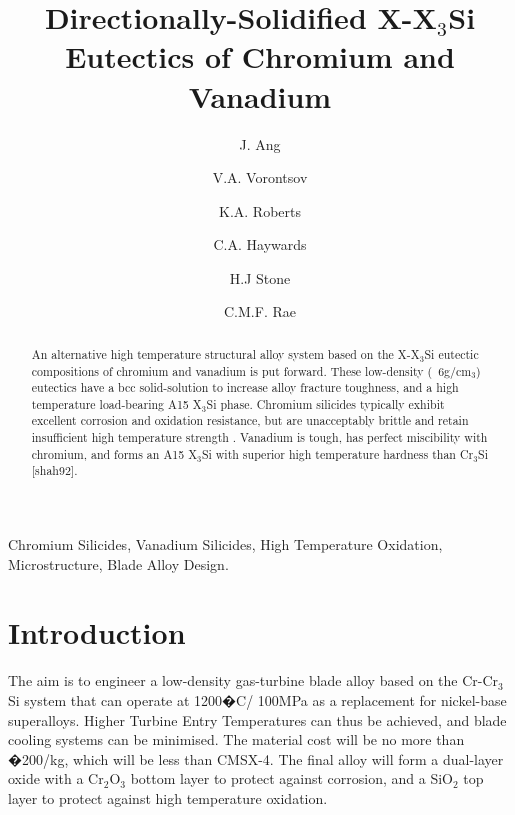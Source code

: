 \documentclass[preprint]{elsarticle}
\begin{document}
\begin{frontmatter}
\title{Directionally-Solidified X-X$_3$Si Eutectics of Chromium and Vanadium}
%
\author[CAM]{J. Ang}
\author[GE]{V.A. Vorontsov}
\author[OSU]{K.A. Roberts}
\author[IMP]{C.A. Haywards}
\author[IMP]{H.J Stone}
\author[CAM]{C.M.F. Rae}


\address[CAM]{Department of Materials Science and Metallurgy, University of Cambridge, Pembroke Street, Cambridge, CB2 3QZ, UK}
\address[GE]{GE Global Research, Niskayuna, NY, 12309, USA}
\address[OSU]{Department of Materials Science and Engineering, The Ohio State University, 2041 College Road, Columbus, OH 43210, USA}
\address[IMP]{Department of Materials, Royal School of Mines, Imperial College, South Kensington, London SW7 2AZ, UK}
%
\begin{abstract}
An alternative high temperature structural alloy system based on the X-X$_3$Si eutectic compositions of chromium and vanadium is put forward. These low-density (~6g/cm$_3$) eutectics have a bcc solid-solution to increase alloy fracture toughness, and a high temperature load-bearing A15 X$_3$Si phase. Chromium silicides typically exhibit excellent corrosion and oxidation resistance, but are unacceptably brittle and retain insufficient high temperature strength \cite{jackson96, fleischer89, sadananda99}. Vanadium is tough, has perfect miscibility with chromium, and forms an A15 X$_3$Si with superior high temperature hardness than Cr$_3$Si [shah92]. 


\end{abstract}

\begin{keyword}
Chromium Silicides, Vanadium Silicides, High Temperature Oxidation, Microstructure, Blade Alloy Design.
\end{keyword}
\end{frontmatter}
%
\section{Introduction}

The aim is to engineer a low-density gas-turbine blade alloy based on the Cr-Cr$_3$Si system that can operate at 1200�C/ 100MPa as a replacement for nickel-base superalloys. Higher Turbine Entry Temperatures can thus be achieved, and blade cooling systems can be minimised.
The material cost will be no more than �200/kg, which will be less than CMSX-4. The final alloy will form a dual-layer oxide with a Cr$_2$O$_3$ bottom layer to protect against corrosion, and a SiO$_2$ top layer to protect against high temperature oxidation. 
\end{document}
